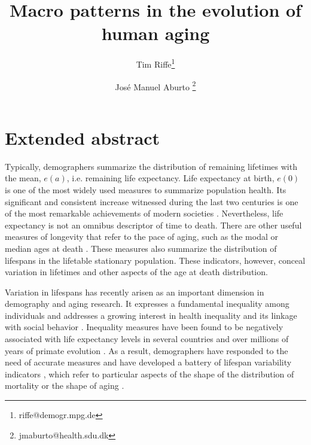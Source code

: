 \documentclass{article}
\begin{document}
\title{Macro patterns in the evolution of human aging}

\author[1]{Tim Riffe\thanks{riffe@demogr.mpg.de}}
\author[2,3]{Jos\'e Manuel Aburto \thanks{jmaburto@health.sdu.dk}}

\maketitle

\section*{Extended abstract}

\doublespacing

Typically, demographers summarize the distribution of remaining
lifetimes with the mean, $e(a)$, i.e. remaining life expectancy. Life expectancy
at birth, $e(0)$ is one of the most widely used measures to summarize population health. Its significant and consistent increase witnessed during the last two centuries is one of the most remarkable achievements of modern societies \citep{oeppen2002broken}. Nevertheless, life
expectancy is not an omnibus descriptor of time to death. There are other
useful measures of longevity that refer to the pace of aging, such as the modal
or median ages at death \citep{canudas2010three}. These measures also
summarize the distribution of lifespans in the lifetable stationary population.
These indicators, however, conceal variation in lifetimes and other aspects of the age at death distribution.

Variation in lifespans has recently arisen as an important dimension in
demography and aging research. It expresses a fundamental inequality among
individuals and addresses a growing interest in health inequality and its
linkage with social behavior \citep{mackenbach2012persistence}. Inequality
measures have been found to be negatively associated with life expectancy
levels in several countries and over millions of years of primate evolution
\citep{vaupel2011life, colchero2016emergence}. As a result, demographers have
responded to the need of accurate measures and have developed a battery of lifespan variability indicators \citep{van2013perturbation}, which refer to particular aspects of the shape of the distribution of mortality or the shape of aging \citep{wrycza2015quantifying}.
\end{document}
